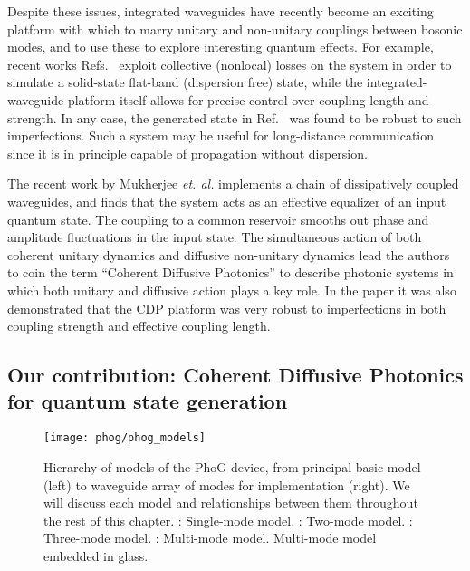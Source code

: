 Despite these issues, integrated waveguides have recently become an exciting platform with which to marry unitary and non-unitary couplings between bosonic modes, and to use these to explore interesting quantum effects. For example, recent works Refs.~\cite{Mukherjee2015, Vicencio2015} exploit collective (nonlocal) losses on the system in order to simulate a solid-state flat-band (dispersion free) state, while the integrated-waveguide platform itself allows for precise control over coupling length and strength. In any case, the generated state in Ref.~\cite{Mukherjee2015} was found to be robust to such imperfections. Such a system may be useful for long-distance communication since it is in principle capable of propagation without dispersion.

The recent work by Mukherjee \emph{et. al.} \cite{Mukherjee2017} implements a chain of dissipatively coupled waveguides, and finds that the system acts as an effective equalizer of an input quantum state. The coupling to a common reservoir smooths out phase and amplitude fluctuations in the input state. The simultaneous action of both coherent unitary dynamics and diffusive non-unitary dynamics lead the authors to coin the term ``Coherent Diffusive Photonics'' to describe photonic systems in which both unitary and diffusive action plays a key role. In the paper it was also demonstrated that the CDP platform was very robust to imperfections in both coupling strength and effective coupling length.

\subsection{Our contribution: Coherent Diffusive Photonics for quantum state generation}

\begin{figure}[htp]
\captionsetup{width=\linewidth}
\centering
\texttt{[image: phog/phog\_models]}
\caption{\label{fig:phog_models} Hierarchy of models of the PhoG device, from principal basic model (left) to waveguide array of modes for implementation (right). We will discuss each model and relationships between them throughout the rest of this chapter. \MakeUppercase{}: Single-mode model. \MakeUppercase{}: Two-mode model. \MakeUppercase{}: Three-mode model. \MakeUppercase{}: Multi-mode model. \MakeUppercase{} Multi-mode model embedded in glass. }
\end{figure}

